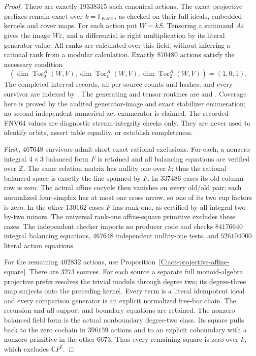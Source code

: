\begin{proof}
There are exactly $19338315$ such canonical actions.  The exact
projective prefixes remain exact over $k=\mathbb F_{65521}$,
as checked on their full ideals, embedded kernels and cover maps.
For each action put $W=\widetilde{kS}$.  Tensoring a summand
$A\varepsilon$ gives the image $W\varepsilon$, and a differential
is right multiplication by its literal generator value.
All ranks are calculated over this field, without inferring a
rational rank from a modular calculation.  Exactly $870480$
actions satisfy the necessary condition
\[
 (\dim\operatorname{Tor}_0^A(W,V),
   \dim\operatorname{Tor}_1^A(W,V),
   \dim\operatorname{Tor}_2^A(W,V))=(1,0,1).
\]
The completed interval records, all per-source counts and hashes,
and every survivor are indexed by
.
The generating and tensor routines are
 and
.
Coverage here is proved by the audited generator-image and exact
stabilizer enumeration; no second independent numerical act
enumerator is claimed.  The recorded FNV64 values are diagnostic
stream-integrity checks only.  They are never used to identify
orbits, assert table equality, or establish completeness.

First, $467648$ survivors admit short exact rational exclusions.
For each, a nonzero integral $4\times3$ balanced form $F$ is
retained and all balancing equations are verified over $\mathbb Z$.
The same relation matrix has nullity one over $k$; thus the
rational balanced space is exactly the line spanned by $F$.
In $337486$ cases its old-column row is zero.  The actual affine
cocycle then vanishes on every old/old pair; each normalized
four-simplex has at most one cross arrow, so one of its two cup
factors is zero.  In the other $130162$ cases $F$ has rank one,
as certified by all integral two-by-two minors.  The universal
rank-one affine-square primitive excludes these cases.
The independent checker
 imports no producer
code and checks $84176640$ integral balancing equations,
$467648$ independent nullity-one tests, and $526104000$ literal
action equations.

For the remaining $402832$ actions, use
Proposition~\ref{C:act-projective-affine-square}.
There are $3273$ sources.  For each source a separate full
monoid-algebra projective prefix resolves the trivial module
through degree two; its degree-three map surjects onto the preceding
kernel.  Every term is a literal idempotent ideal and every
comparison generator is an explicit normalized free-bar chain.
The recursion and all support and boundary equations are retained.
The nonzero balanced field form is the actual nonboundary
degree-two class.  Its square pulls back to the zero cochain in
$396159$ actions and to an explicit coboundary with a nonzero
primitive in the other $6673$.  Thus every remaining square is
zero over $k$, which excludes $\mathbb CP^2$.


\end{proof}
